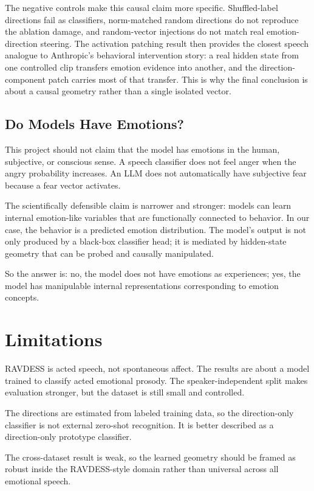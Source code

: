 \documentclass[conference]{IEEEtran}
\begin{document}
The negative controls make this causal claim more specific. Shuffled-label directions fail as classifiers, norm-matched random directions do not reproduce the ablation damage, and random-vector injections do not match real emotion-direction steering. The activation patching result then provides the closest speech analogue to Anthropic's behavioral intervention story: a real hidden state from one controlled clip transfers emotion evidence into another, and the direction-component patch carries most of that transfer. This is why the final conclusion is about a causal geometry rather than a single isolated vector.

\subsection{Do Models Have Emotions?}

This project should not claim that the model has emotions in the human, subjective, or conscious sense. A speech classifier does not feel anger when the angry probability increases. An LLM does not automatically have subjective fear because a fear vector activates.

The scientifically defensible claim is narrower and stronger: models can learn internal emotion-like variables that are functionally connected to behavior. In our case, the behavior is a predicted emotion distribution. The model's output is not only produced by a black-box classifier head; it is mediated by hidden-state geometry that can be probed and causally manipulated.

So the answer is: no, the model does not have emotions as experiences; yes, the model has manipulable internal representations corresponding to emotion concepts.

\section{Limitations}

RAVDESS is acted speech, not spontaneous affect. The results are about a model trained to classify acted emotional prosody. The speaker-independent split makes evaluation stronger, but the dataset is still small and controlled.

The directions are estimated from labeled training data, so the direction-only classifier is not external zero-shot recognition. It is better described as a direction-only prototype classifier.

The cross-dataset result is weak, so the learned geometry should be framed as robust inside the RAVDESS-style domain rather than universal across all emotional speech.
\end{document}
